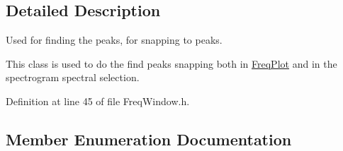 \subsection{Detailed Description}
Used for finding the peaks, for snapping to peaks. 

This class is used to do the \textquotesingle{}find peaks\textquotesingle{} snapping both in \hyperlink{class_freq_plot}{Freq\+Plot} and in the spectrogram spectral selection. 

Definition at line 45 of file Freq\+Window.\+h.



\subsection{Member Enumeration Documentation}
